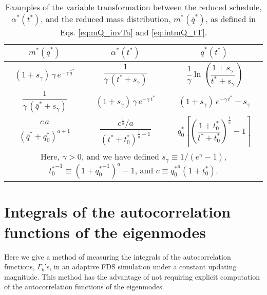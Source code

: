 \documentclass[reprint, superscriptaddress, floatfix]{revtex4-1}
\begin{document}
\begin{table}[h]
  \caption{\label{tab:m_and_a}
    Examples of the variable transformation between the
    reduced schedule, $\alpha^*(t^*)$,
    and the reduced mass distribution, $m^*(\bar q^*)$,
    as defined in Eqs. \eqref{eq:mQ_invTa}
    and \eqref{eq:intmQ_tT}.
  }
  \setlength{\tabcolsep}{2pt} %
  \renewcommand\arraystretch{2.0} %
  \begin{tabular} { c c c }
    \hline
    $m^*(\bar q^*)$ &
    $\alpha^*(t^*)$ &
    $\bar q^*(t^*)$
    \\
    \hline
    $(1+ s_\gamma) \, \gamma \, e^{-\gamma \, {\bar q}^*}$ &
    $\dfrac{1}{ \gamma \, (t^* + s_\gamma) }$ &
    $\dfrac{1}{\gamma} \ln\left(\dfrac{1 + s_\gamma}{t^* + s_\gamma} \right)$
    \\
    $\dfrac{1}{\gamma \, ({\bar q}^* + s_\gamma) }$ &
    $(1 + s_\gamma) \, \gamma \, e^{-\gamma \, t^*}$ &
    $(1 + s_\gamma) \, e^{-\gamma \, t^*} - s_\gamma$
    \\
    $\dfrac{c \, a}{\left( {\bar q}^* + q^*_0 \right)^{a+1}}$ &
    $\dfrac{c^{\frac 1 a} / a}{\left( t^* + t^*_0 \right)^{\frac{1}{a}+1}}$ &
    $q^*_0 \left[\left( \dfrac{1+t^*_0}{t^* + t^*_0} \right)^\frac{1}{a} - 1\right]$
    \\
    \hline
    \multicolumn{3}{p{8cm}}{
    Here,
    $\gamma > 0$,
    and we have defined
    $s_\gamma \equiv 1/(e^\gamma - 1)$,
    ${t^*_0}^{-1} \equiv \left(1+{q^*_0}^{-1}\right)^a - 1$,
    and
    $c \equiv {q^*_0}^a(1 + t^*_0)$.
    } \\
    \hline
  \end{tabular}
\end{table}




\section{\label{sec:Gamma_measure}
Integrals of the autocorrelation functions of the eigenmodes
}



Here we give a method of measuring
the integrals of the autocorrelation functions, $\Gamma_k$'s,
in an adaptive FDS simulation
under a constant updating magnitude.
%
This method has the advantage of not requiring
explicit computation of
the autocorrelation functions of the eigenmodes.
\end{document}
